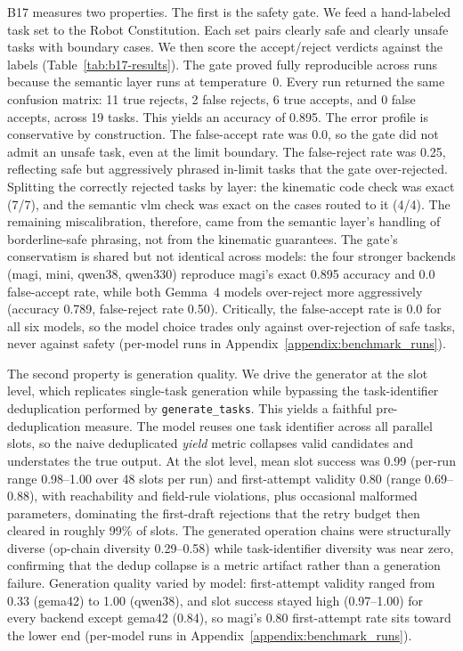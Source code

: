 \documentclass[
     12pt,
     a4paper,
     BCOR=10mm,
     DIV=14,
     listof=totoc,
     bibliography=totoc,
     parskip,
     twoside,
     headsepline
     ]{scrreprt}
\begin{document}
B17 measures two properties. The first is the safety gate. We feed a hand-labeled task set to the Robot Constitution. Each set pairs clearly safe and clearly unsafe tasks with boundary cases. We then score the accept/reject verdicts against the labels (Table~\ref{tab:b17-results}). The gate proved fully reproducible across runs because the semantic layer runs at temperature~0. Every run returned the same confusion matrix: 11 true rejects, 2 false rejects, 6 true accepts, and 0 false accepts, across 19 tasks. This yields an accuracy of 0.895. The error profile is conservative by construction. The false-accept rate was 0.0, so the gate did not admit an unsafe task, even at the limit boundary. The false-reject rate was 0.25, reflecting safe but aggressively phrased in-limit tasks that the gate over-rejected. Splitting the correctly rejected tasks by layer: the kinematic code check was exact (7/7), and the semantic \gls{vlm} check was exact on the cases routed to it (4/4). The remaining miscalibration, therefore, came from the semantic layer's handling of borderline-safe phrasing, not from the kinematic guarantees. The gate's conservatism is shared but not identical across models: the four stronger backends (\gls{magi}, \gls{mini}, \gls{qwen38}, \gls{qwen330}) reproduce \gls{magi}'s exact 0.895 accuracy and 0.0 false-accept rate, while both Gemma~4 models over-reject more aggressively (accuracy 0.789, false-reject rate 0.50). Critically, the false-accept rate is 0.0 for all six models, so the model choice trades only against over-rejection of safe tasks, never against safety (per-model runs in Appendix~\ref{appendix:benchmark_runs}).

The second property is generation quality. We drive the generator at the slot level, which replicates single-task generation while bypassing the task-identifier deduplication performed by \texttt{generate\_tasks}. This yields a faithful pre-deduplication measure. The model reuses one task identifier across all parallel slots, so the naive deduplicated \textit{yield} metric collapses valid candidates and understates the true output. At the slot level, mean slot success was 0.99 (per-run range 0.98--1.00 over 48 slots per run) and first-attempt validity 0.80 (range 0.69--0.88), with reachability and field-rule violations, plus occasional malformed parameters, dominating the first-draft rejections that the retry budget then cleared in roughly 99\% of slots. The generated operation chains were structurally diverse (op-chain diversity 0.29--0.58) while task-identifier diversity was near zero, confirming that the dedup collapse is a metric artifact rather than a generation failure. Generation quality varied by model: first-attempt validity ranged from 0.33 (\gls{gema42}) to 1.00 (\gls{qwen38}), and slot success stayed high (0.97--1.00) for every backend except \gls{gema42} (0.84), so \gls{magi}'s 0.80 first-attempt rate sits toward the lower end (per-model runs in Appendix~\ref{appendix:benchmark_runs}).
\end{document}
